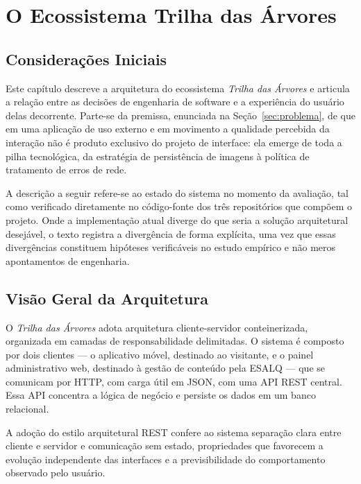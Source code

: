 \chapter{O Ecossistema Trilha das Árvores}
\label{cap:desenvolvimento}

\section{Considerações Iniciais}
\label{sec:dev_consideracoes}

Este capítulo descreve a arquitetura do ecossistema \textit{Trilha das Árvores} e
articula a relação entre as decisões de engenharia de software e a experiência do
usuário delas decorrente. Parte-se da premissa, enunciada na
Seção~\ref{sec:problema}, de que em uma aplicação de uso externo e em movimento a
qualidade percebida da interação não é produto exclusivo do projeto de interface:
ela emerge de toda a pilha tecnológica, da estratégia de persistência de imagens à
política de tratamento de erros de rede.

A descrição a seguir refere-se ao estado do sistema no momento da avaliação, tal
como verificado diretamente no código-fonte dos três repositórios que compõem o
projeto. Onde a implementação atual diverge do que seria a solução arquitetural
desejável, o texto registra a divergência de forma explícita, uma vez que essas
divergências constituem hipóteses verificáveis no estudo empírico e não meros
apontamentos de engenharia.

\section{Visão Geral da Arquitetura}
\label{sec:arquitetura}

O \textit{Trilha das Árvores} adota arquitetura cliente-servidor conteinerizada,
organizada em camadas de responsabilidade delimitadas. O sistema é composto por
dois clientes --- o aplicativo móvel, destinado ao visitante, e o painel
administrativo web, destinado à gestão de conteúdo pela ESALQ --- que se
comunicam por HTTP, com carga útil em JSON, com uma API REST central. Essa API
concentra a lógica de negócio e persiste os dados em um banco relacional.

A adoção do estilo arquitetural REST \cite{fielding2000} confere ao sistema
separação clara entre cliente e servidor e comunicação sem estado, propriedades
que favorecem a evolução independente das interfaces e a previsibilidade do
comportamento observado pelo usuário.

